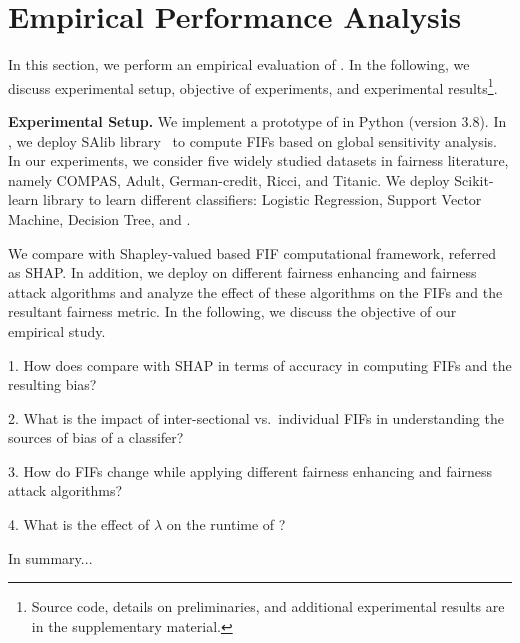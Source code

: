 \section{Empirical Performance Analysis}\label{sec:experiments}
In this section, we perform an empirical evaluation of {\framework}. In the following, we discuss experimental setup, objective of experiments, and experimental results\footnote{Source code, details on preliminaries, and additional experimental results are in the supplementary material.}. 

\noindent\textbf{Experimental Setup.} We implement a prototype of {\framework} in Python (version $ 3.8 $). In {\framework}, we deploy SAlib library~\cite{Herman2017} to compute FIFs based on global sensitivity analysis. In our experiments, we consider five widely studied datasets in fairness literature, namely COMPAS, Adult, German-credit, Ricci, and Titanic. We deploy Scikit-learn library to learn different classifiers: Logistic Regression, Support Vector Machine, Decision Tree, and . 

We compare {\framework} with Shapley-valued based FIF computational framework, referred as SHAP. In addition, we deploy {\framework} on different fairness enhancing and fairness attack algorithms and analyze the effect of these algorithms on the FIFs and the resultant fairness metric. In the following, we discuss the objective of our empirical study. 

1. How does {\framework} compare with SHAP in terms of accuracy in computing FIFs and the resulting bias?

2. What is the impact of inter-sectional vs.\ individual FIFs in understanding the sources of bias of a classifer?

3. How do FIFs change while applying different fairness enhancing and fairness attack algorithms?

4. What is the effect of $ \lambda $ on the runtime of {\framework}?

In summary...



